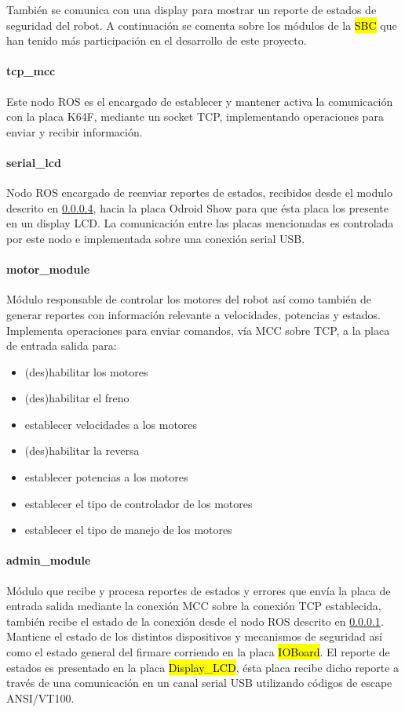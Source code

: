 \documentclass[withindex,glossary]{cam-thesis}
\begin{document}
También se comunica con una display para mostrar un reporte de estados de seguridad del robot.
A continuación se comenta sobre los módulos de la \hl{SBC} que han tenido más participación en el desarrollo de este proyecto.

\paragraph{tcp\_mcc} \label{sec:Sol Prop :: tcp_mcc}
Este nodo ROS es el encargado de establecer y mantener activa la comunicación con la placa K64F, mediante un socket TCP, implementando operaciones para enviar y recibir información.

\paragraph{serial\_lcd}
Nodo ROS encargado de reenviar reportes de estados, recibidos desde el modulo descrito en \ref{sec:Sol Prop :: admin_module}, hacia la placa Odroid Show para que ésta placa los presente en un display LCD. La comunicación entre las placas mencionadas es controlada por este nodo e implementada sobre una conexión serial USB.

\paragraph{motor\_module}
Módulo responsable de controlar los motores del robot así como también  de generar reportes con información relevante a velocidades, potencias y estados. Implementa operaciones para enviar comandos, vía MCC sobre TCP, a la placa de entrada salida para:
\begin{itemize}
	\item (des)habilitar los motores	
	\item (des)habilitar el freno	
	\item establecer velocidades a los motores
	\item (des)habilitar la reversa
	\item establecer potencias a los motores
	\item establecer el tipo de controlador de los motores
	\item establecer el tipo de manejo de los motores
\end{itemize}

\paragraph{admin\_module} \label{sec:Sol Prop :: admin_module}
Módulo que recibe y procesa reportes de estados y errores que envía la placa de entrada salida mediante la conexión MCC sobre la conexión TCP establecida, también recibe el estado de la conexión desde el nodo ROS descrito en \ref{sec:Sol Prop :: tcp_mcc}. Mantiene el estado de los distintos dispositivos y mecanismos de seguridad así como el estado general del firmare corriendo en la placa \hl{IOBoard}. El reporte de estados es presentado en la placa \hl{Display\_LCD}, ésta placa recibe dicho reporte a través de una comunicación en un canal serial USB utilizando códigos de escape ANSI/VT100.
\end{document}
